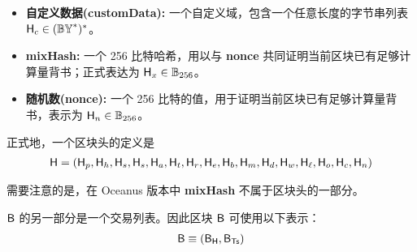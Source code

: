 \begin{itemize}[nosep]
	\item {\bf 自定义数据(customData):} 一个自定义域，包含一个任意长度的字节串列表 $\textsf{H}_c\in (\mathbb{BY}^*)^*$。

	\item {\bf mixHash:} 一个 256 比特哈希，用以与 {\bf nonce} 共同证明当前区块已有足够计算量背书；正式表达为 $\textsf{H}_x\in\mathbb{B}_{256}$。

	\item {\bf 随机数(nonce):} 一个 256 比特的值，用于证明当前区块已有足够计算量背书，表示为 $\textsf{H}_n\in\mathbb{B}_{256}$。


\end{itemize}

正式地，一个区块头的定义是
%
\begin{align}
	\textsf{H} = (\textsf{H}_p,\textsf{H}_h,\textsf{H}_s,\textsf{H}_s,\textsf{H}_a,\textsf{H}_t,\textsf{H}_r,\textsf{H}_e,\textsf{H}_b,\textsf{H}_m,\textsf{H}_d,\textsf{H}_w,\textsf{H}_\ell,\textsf{H}_o,\textsf{H}_c,\textsf{H}_n)
\end{align}

需要注意的是，在 Oceanus 版本中 {\bf mixHash} 不属于区块头的一部分。

$\textsf{B}$ 的另一部分是一个交易列表。因此区块 $\textsf{B}$ 可使用以下表示：  
\begin{align}
	\textsf{B}\equiv \left(\textsf{B}_{\textsf{H}}, \textsf{B}_{\textsf{Ts}} \right)
\end{align}


